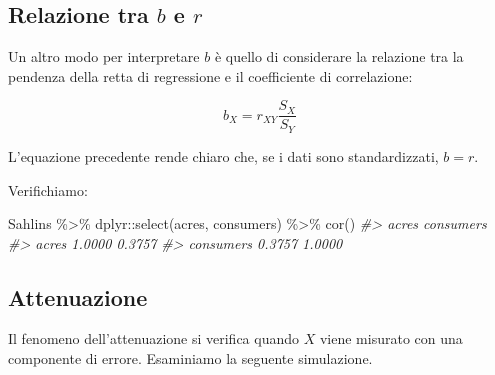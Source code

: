 \documentclass[
  11pt,
]{krantz}
\makeatletter
\newenvironment{Shaded}{\begin{snugshade}}{\end{snugshade}}
\newcommand{\AttributeTok}[1]{\textcolor[rgb]{0.61,0.61,0.61}{#1}}
\newcommand{\CommentTok}[1]{\textcolor[rgb]{0.37,0.37,0.37}{\textit{#1}}}
\newcommand{\FunctionTok}[1]{\textcolor[rgb]{0,0,0}{#1}}
\newcommand{\NormalTok}[1]{#1}
\newcommand{\OtherTok}[1]{\textcolor[rgb]{0.37,0.37,0.37}{#1}}
\newcommand{\SpecialCharTok}[1]{\textcolor[rgb]{0,0,0}{#1}}
\newenvironment{kframe}{%
\medskip{}
\setlength{\fboxsep}{.8em}
 \def\at@end@of@kframe{}%
 \ifinner\ifhmode%
  \def\at@end@of@kframe{\end{minipage}}%
  \begin{minipage}{\columnwidth}%
 \fi\fi%
 \def\FrameCommand##1{\hskip\@totalleftmargin \hskip-\fboxsep
 \colorbox{shadecolor}{##1}\hskip-\fboxsep
     \hskip-\linewidth \hskip-\@totalleftmargin \hskip\columnwidth}%
 \MakeFramed {\advance\hsize-\width
   \@totalleftmargin\z@ \linewidth\hsize
   \@setminipage}}%
 {\par\unskip\endMakeFramed%
 \at@end@of@kframe}
\renewenvironment{Shaded}{\begin{kframe}}{\end{kframe}}
\theoremstyle{definition}
\theoremstyle{definition}
\theoremstyle{definition}
\theoremstyle{definition}
\theoremstyle{remark}
\makeatother
\begin{document}
\hypertarget{relazione-tra-b-e-r}{%
\subsection{\texorpdfstring{Relazione tra \(b\) e \(r\)}{Relazione tra b e r}}\label{relazione-tra-b-e-r}}

Un altro modo per interpretare \(b\) è quello di considerare la relazione tra la pendenza della retta di regressione e il coefficiente di correlazione:

\[
b_X = r_{XY} \frac{S_X}{S_Y}
\]

L'equazione precedente rende chiaro che, se i dati sono standardizzati, \(b = r\).

Verifichiamo:

\begin{Shaded}
\begin{Highlighting}[]
\NormalTok{Sahlins }\SpecialCharTok{\%\textgreater{}\%}
\NormalTok{  dplyr}\SpecialCharTok{::}\FunctionTok{select}\NormalTok{(acres, consumers) }\SpecialCharTok{\%\textgreater{}\%}
  \FunctionTok{cor}\NormalTok{()}
\CommentTok{\#\textgreater{}            acres consumers}
\CommentTok{\#\textgreater{} acres     1.0000    0.3757}
\CommentTok{\#\textgreater{} consumers 0.3757    1.0000}
\end{Highlighting}
\end{Shaded}

\begin{Shaded}
\end{Shaded}

\hypertarget{attenuazione}{%
\subsection{Attenuazione}\label{attenuazione}}

Il fenomeno dell'attenuazione si verifica quando \(X\) viene misurato con una componente di errore. Esaminiamo la seguente simulazione.
\end{document}
